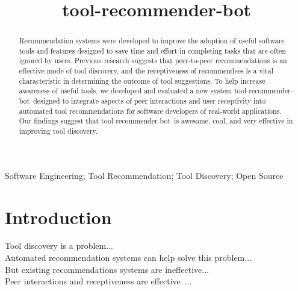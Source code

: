 \documentclass[conference]{IEEEtran}
\newcommand{\tool}{tool-recommender-bot}
\begin{document}

\title{\tool}

\author{
}

\maketitle
\begin{abstract}
Recommendation systems were developed to improve the adoption of useful software tools and features designed to save time and effort in completing tasks that are often ignored by users. Previous research suggests that peer-to-peer recommendations is an effective mode of tool discovery, and the receptiveness of recommendees is a vital characteristic in determining the outcome of tool suggestions. To help increase awareness of useful tools, we developed and evaluated a new system \tool~designed to integrate aspects of peer interactions and user receptivity into automated tool recommendations for software developers of real-world applications. Our findings suggest that \tool~is awesome, cool, and very effective in improving tool discovery.
\end{abstract}

\begin{IEEEkeywords}
Software Engineering; Tool Recommendation; Tool Discovery; Open Source
\end{IEEEkeywords}

\section{Introduction}
Tool discovery is a problem... \\

Automated recommendation systems can help solve this problem... \\

But existing recommendations systems are ineffective... \\

Peer interactions and receptiveness are effective~\cite{vlhcc17}... \\
\end{document}
